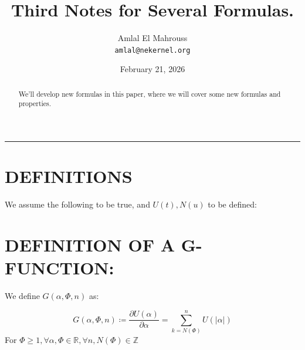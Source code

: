 \documentclass[11pt, a4paper]{article}
\title{Third Notes for Several Formulas.}
\author{Amlal El Mahrouss\\\texttt{amlal@nekernel.org}}
\date{February 21, 2026}
\begin{document}
\maketitle

\begin{center}
	\rule[0.01cm]{17cm}{0.01cm}
\end{center}

\begin{abstract}
\begin{center}
    We'll develop new formulas in this paper, where we will cover some new formulas and properties.
\end{center}
\end{abstract}

\section{DEFINITIONS}

We assume the following to be true, and $U(t), N(u)$ to be defined:

\section{DEFINITION OF A G-FUNCTION:}

We define $G(\alpha, \Phi, n)$ as:

\begin{equation}
    G(\alpha, \Phi, n) \coloneqq \frac{\partial U(\alpha)}{\partial \alpha} = \sum_{k=N(\Phi)}^{n} U(|\alpha|)
\end{equation}
For $\Phi \geq 1, \forall \alpha, \Phi \in \mathbb{R}, \forall n, N(\Phi) \in \mathbb{Z}$
\end{document}
